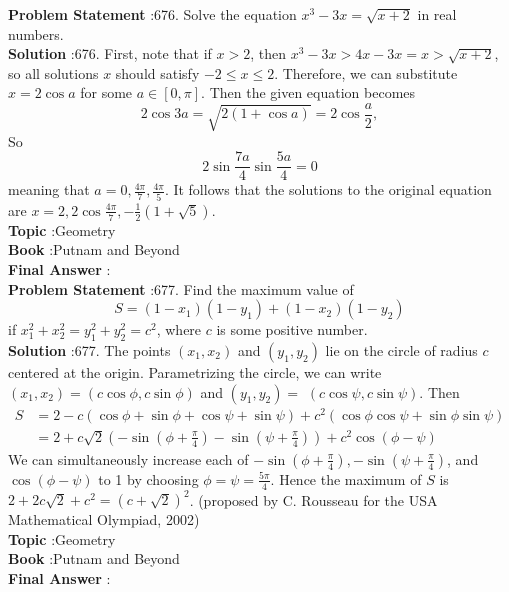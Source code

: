 \documentclass[10pt]{article}
\begin{document}
\textbf{Problem Statement} :676. Solve the equation $x^{3}-3 x=\sqrt{x+2}$ in real numbers. \\
\textbf{Solution} :676. First, note that if $x>2$, then $x^{3}-3 x>4 x-3 x=x>\sqrt{x+2}$, so all solutions $x$ should satisfy $-2 \leq x \leq 2$. Therefore, we can substitute $x=2 \cos a$ for some $a \in[0, \pi]$. Then the given equation becomes$$ 2 \cos 3 a=\sqrt{2(1+\cos a)}=2 \cos \frac{a}{2}, $$So$$ 2 \sin \frac{7 a}{4} \sin \frac{5 a}{4}=0 $$meaning that $a=0, \frac{4 \pi}{7}, \frac{4 \pi}{5}$. It follows that the solutions to the original equation are $x=2,2 \cos \frac{4 \pi}{7},-\frac{1}{2}(1+\sqrt{5})$.\\
\textbf{Topic} :Geometry\\
\textbf{Book} :Putnam and Beyond\\
\textbf{Final Answer} :\\


\textbf{Problem Statement} :677. Find the maximum value of$$ S=\left(1-x_{1}\right)\left(1-y_{1}\right)+\left(1-x_{2}\right)\left(1-y_{2}\right) $$if $x_{1}^{2}+x_{2}^{2}=y_{1}^{2}+y_{2}^{2}=c^{2}$, where $c$ is some positive number.\\
\textbf{Solution} :677. The points $\left(x_{1}, x_{2}\right)$ and $\left(y_{1}, y_{2}\right)$ lie on the circle of radius $c$ centered at the origin. Parametrizing the circle, we can write $\left(x_{1}, x_{2}\right)=(c \cos \phi, c \sin \phi)$ and $\left(y_{1}, y_{2}\right)=$ $(c \cos \psi, c \sin \psi)$. Then$$ \begin{aligned} S &=2-c(\cos \phi+\sin \phi+\cos \psi+\sin \psi)+c^{2}(\cos \phi \cos \psi+\sin \phi \sin \psi) \\ &=2+c \sqrt{2}\left(-\sin \left(\phi+\frac{\pi}{4}\right)-\sin \left(\psi+\frac{\pi}{4}\right)\right)+c^{2} \cos (\phi-\psi) \end{aligned} $$We can simultaneously increase each of $-\sin \left(\phi+\frac{\pi}{4}\right),-\sin \left(\psi+\frac{\pi}{4}\right)$, and $\cos (\phi-\psi)$ to 1 by choosing $\phi=\psi=\frac{5 \pi}{4}$. Hence the maximum of $S$ is $2+2 c \sqrt{2}+c^{2}=(c+\sqrt{2})^{2}$. (proposed by C. Rousseau for the USA Mathematical Olympiad, 2002)\\
\textbf{Topic} :Geometry\\
\textbf{Book} :Putnam and Beyond\\
\textbf{Final Answer} :\\
\end{document}
